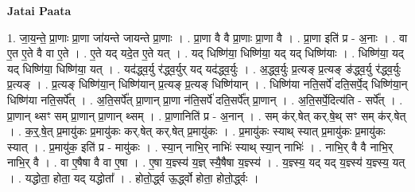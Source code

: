 \documentclass[17pt]{extarticle}
\begin{document}
\textbf{Jatai Paata} \newline

1. जा॒य॒न्ते॒ प्रा॒णाः प्रा॒णा जा॑यन्ते जायन्ते प्रा॒णाः । . प्रा॒णा वै वै प्रा॒णाः प्रा॒णा वै । . प्रा॒णा इति॑ प्र - अ॒नाः । . वा ए॒त ए॒ते वै वा ए॒ते । . ए॒ते यद् यदे॒त ए॒ते यत् । . यद् धिष्णि॑या॒ धिष्णि॑या॒ यद् यद् धिष्णि॑याः । . धिष्णि॑या॒ यद् यद् धिष्णि॑या॒ धिष्णि॑या॒ यत् । . यद॑द्ध्व॒र्यु र॑द्ध्व॒र्युर् यद् यद॑द्ध्व॒र्युः । . अ॒द्ध्व॒र्युः प्र॒त्यङ् प्र॒त्यङ् ङ॑द्ध्व॒र्यु र॑द्ध्व॒र्युः प्र॒त्यङ् । . प्र॒त्यङ् धिष्णि॑या॒न् धिष्णि॑यान् प्र॒त्यङ् प्र॒त्यङ् धिष्णि॑यान् । . धिष्णि॑या नति॒सर्पे॑ दति॒सर्पे॒द् धिष्णि॑या॒न् धिष्णि॑या नति॒सर्पे᳚त् । . अ॒ति॒सर्पे᳚त् प्रा॒णान् प्रा॒णा न॑ति॒सर्पे॑ दति॒सर्पे᳚त् प्रा॒णान् । . अ॒ति॒सर्पे॒दित्य॑ति - सर्पे᳚त् । . प्रा॒णान् थ्सꣳ सम् प्रा॒णान् प्रा॒णान् थ्सम् । . प्रा॒णानिति॑ प्र - अ॒नान् । . सम् क॑र्.षेत् कर्.षे॒थ् सꣳ सम् क॑र्.षेत् । . क॒र्॒.षे॒त् प्र॒मायु॑कः प्र॒मायु॑कः कर्.षेत् कर्.षेत् प्र॒मायु॑कः । . प्र॒मायु॑कः स्याथ् स्यात् प्र॒मायु॑कः प्र॒मायु॑कः स्यात् । . प्र॒मायु॑क॒ इति॑ प्र - मायु॑कः । . स्या॒न् नाभि॒र् नाभिः॑ स्याथ् स्या॒न् नाभिः॑ । . नाभि॒र् वै वै नाभि॒र् नाभि॒र् वै । . वा ए॒षैषा वै वा ए॒षा । . ए॒षा य॒ज्ञ्स्य॑ य॒ज्ञ् स्यै॒षैषा य॒ज्ञ्स्य॑ । . य॒ज्ञ्स्य॒ यद् यद् य॒ज्ञ्स्य॑ य॒ज्ञ्स्य॒ यत् । . यद्धोता॒ होता॒ यद् यद्धोता᳚ । . होतो॒र्द्ध्व ऊ॒र्द्ध्वो होता॒ होतो॒र्द्ध्वः । \newline
\end{document}
